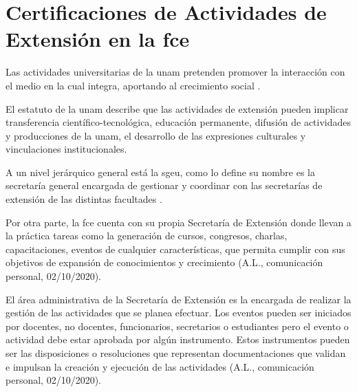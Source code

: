 



\section{Certificaciones de Actividades de Extensión en la \gls{fce} }
Las actividades universitarias de la \gls{unam} pretenden promover la interacción con el
medio en la cual integra, aportando al crecimiento social \cite[]{estatuto}. 

El estatuto \cite[]{estatuto} de la \gls{unam} describe que las actividades de extensión pueden implicar transferencia científico-tecnológica, 
educación permanente, difusión de actividades 
y producciones de la \gls{unam}, el desarrollo de las expresiones culturales y vinculaciones institucionales.





A un nivel jerárquico general está la  \gls{sgeu}, como lo define su nombre
es la secretaría general encargada de  gestionar y coordinar con las  secretarías de extensión de las distintas facultades \cite[]{estatuto}.

Por otra parte, la \gls{fce}  cuenta con su propia Secretaría 
de Extensión donde llevan a la práctica tareas como la generación de cursos, congresos, charlas, capacitaciones, eventos 
de cualquier características,
que permita cumplir con sus objetivos de expansión de conocimientos y crecimiento (A.L., comunicación personal, 02/10/2020).%

El área administrativa de la Secretaría de Extensión es la encargada de realizar la gestión de las actividades que se planea efectuar.
Los eventos pueden ser iniciados por docentes, no docentes, funcionarios, secretarios o estudiantes pero el evento o actividad
debe  estar aprobada por algún instrumento.
Estos instrumentos pueden ser las disposiciones o resoluciones  que representan documentaciones que validan e impulsan 
la creación y ejecución de las actividades (A.L., comunicación personal, 02/10/2020).%

